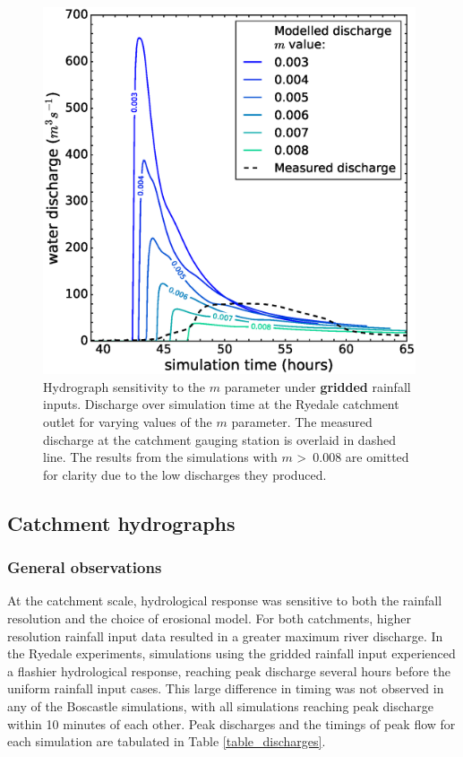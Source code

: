 \begin{figure}[!h]
\includegraphics[width=11cm]{chp_flood_figs_scripts/fig_ryedale_hydro_m_sens_gridded.eps}
\caption{Hydrograph sensitivity to the \(m\) parameter under \textbf{gridded} rainfall inputs. Discharge over simulation time at the Ryedale catchment outlet for varying values of the \(m\) parameter. The measured discharge at the catchment gauging station is overlaid in dashed line. The results from the simulations with \(m\) \textgreater \ 0.008 are omitted for clarity due to the low discharges they produced.}
\label{fig_topmodel_m_ryedale_gridded}
\end{figure}

\subsection{Catchment hydrographs}

\subsubsection{General observations}
At the catchment scale, hydrological response was sensitive to both the rainfall resolution and the choice of erosional model. For both catchments, higher resolution rainfall input data resulted in a greater maximum river discharge. In the Ryedale experiments, simulations using the gridded rainfall input experienced a flashier hydrological response, reaching peak discharge several hours before the uniform rainfall input cases. This large difference in timing was not observed in any of the Boscastle simulations, with all simulations reaching peak discharge within 10 minutes of each other. Peak discharges and the timings of peak flow for each simulation are tabulated in Table \ref{table_discharges}.

